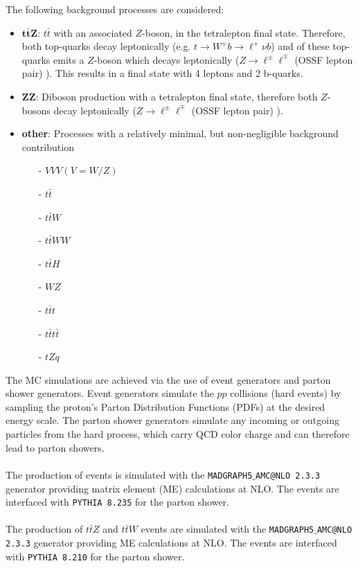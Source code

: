 The following background processes are considered:
\begin{itemize}
	\item $\mathbf{t \bar{t} Z}$: $t \bar{t} $  with an associated $Z$-boson, in the tetralepton final state. Therefore, both top-quarks decay leptonically (e.g. $t \rightarrow W^+ b \rightarrow \ell^+ \nu b$) and of these top-quarks emits a $Z$-boson which decays leptonically ($Z \rightarrow \ell^\pm \ell^\mp$ (OSSF lepton pair) ). This results in a final state with 4 leptons and 2 b-quarks.
	\item $\mathbf{ZZ}$: Diboson production with a tetralepton final state, therefore both $Z$-bosons decay leptonically ($Z \rightarrow \ell^\pm \ell^\mp$ (OSSF lepton pair) ).
	\item \textbf{other}: Processes with a relatively minimal, but non-negligible background contribution
	\begin{itemize}
	\item [-] $VVV (V=W/Z)$
	\item [-] $t\bar{t}$
	\item [-] $t\bar{t}W$
	\item [-] $t\bar{t}WW$
	\item [-] $t\bar{t}H$
	\item [-] $WZ$
	\item [-] $t\bar{t}t$
	\item [-] $t\bar{t}t\bar{t}$
	\item [-] $tZq$
	\end{itemize}
\end{itemize}

The MC simulations are achieved via the use of event generators and parton shower generators. Event generators simulate the $pp$ collisions (hard events) by sampling the proton's Parton Distribution Functions (PDFs) at the desired energy scale. The parton shower generators simulate any incoming or outgoing particles from the hard process, which carry QCD color charge and can therefore lead to parton showers.\\\\

The production of \tWZ events is simulated with the \texttt{MADGRAPH5$\_$AMC@NLO 2.3.3} generator providing matrix element (ME) calculations at NLO. The events are interfaced with \texttt{PYTHIA 8.235} for the parton shower. \\\\

The production of $t\bar{t}Z$ and $t\bar{t}W$ events are simulated with the \texttt{MADGRAPH5$\_$AMC@NLO 2.3.3} generator providing ME calculations at NLO. The events are interfaced with \texttt{PYTHIA 8.210} for the parton shower.\\\\

